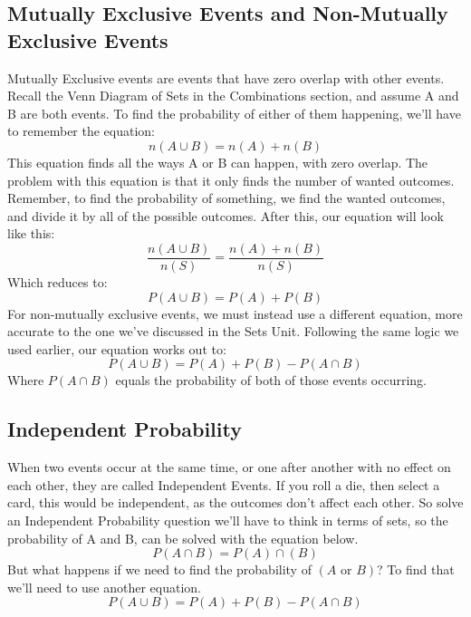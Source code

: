     \subsection{Mutually Exclusive Events and Non-Mutually Exclusive Events}
    Mutually Exclusive events are events that have zero overlap with other events.
    Recall the Venn Diagram of Sets in the Combinations section, and assume A and B are both events.
    To find the probability of either of them happening, we'll have to remember the equation:
    \begin{equation*}
        n(A\cup B) = n(A) + n(B)
    \end{equation*}
    This equation finds all the ways A or B can happen, with zero overlap.
    The problem with this equation is that it only finds the number of wanted outcomes.
    Remember, to find the probability of something, we find the wanted outcomes, and divide it by all of the possible outcomes.
    After this, our equation will look like this:
    \begin{equation*}
        \frac{n(A \cup B)}{n(S)} = \frac{n(A) + n(B)}{n(S)}
    \end{equation*}
    Which reduces to:
    \begin{equation*}
        P(A\cup B) = P(A) + P(B)
    \end{equation*}
    For non-mutually exclusive events, we must instead use a different equation, more accurate to the one we've discussed in the Sets Unit.
    Following the same logic we used earlier, our equation works out to:
    \begin{equation*}
        P(A\cup B) = P(A) + P(B) - P(A\cap B)
    \end{equation*}
    Where $P(A\cap B)$ equals the probability of both of those events occurring.

    \subsection{Independent Probability}
    When two events occur at the same time, or one after another with no effect on each other, they are called Independent Events.
    If you roll a die, then select a card, this would be independent, as the outcomes don't affect each other.
    So solve an Independent Probability question we'll have to think in terms of sets, so the probability of A and B, can be solved with the equation below.
    \begin{equation*}
        P(A\cap B) = P(A) \cap(B)
    \end{equation*}
        But what happens if we need to find the probability of $(A \mbox{ or } B)$?
        To find that we'll need to use another equation.
    \begin{equation*}
        P(A\cup B) = P(A) + P(B) - P(A\cap B)
    \end{equation*}
    
